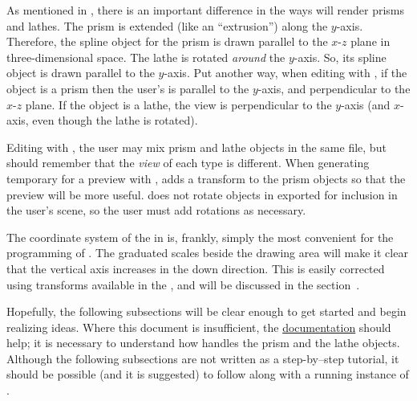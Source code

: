 	As mentioned in ,
	there is an important difference
	in the ways \IXpov{} will render prisms and lathes.
	The prism is extended (like an ``extrusion'') along the
	$y$-axis. Therefore, the spline object for the prism
	is drawn parallel to the $x$-$z$ plane in three-dimensional space.
	The lathe is rotated \emph{around} the $y$-axis. So, its
	spline object is drawn parallel to the $y$-axis. Put another way,
	when editing with \IXpkg{}, if the object is a prism
	then the user's  is parallel to the
	$y$-axis, and perpendicular to the $x$-$z$ plane. If the
	object is a lathe, the view is perpendicular to the $y$-axis
	(and $x$-axis, even though the lathe is rotated).
	
	Editing with \IXpkg{}, the user may mix prism and lathe
	objects in the same file, but should remember that the
	\emph{view} of each type is different. When generating
	temporary  for a preview with \IXpov{}, \IXpkg{}
	adds a  transform to the prism objects
	so that the preview will be more useful. \IXpkgu{} does
	not rotate objects in  exported for
	inclusion in the user's scene, so the user must add
	rotations as necessary.
	
	The coordinate system of the  in \IXpkg{}
	is, frankly, simply the most convenient for the programming
	of \IXpkg{}. The graduated scales beside the drawing area
	will make it clear that the vertical axis increases
	in the down direction. This is easily corrected using
	transforms available in the , and will be discussed
	in the section~.

	Hopefully, the following subsections will be clear enough
	to get started and begin realizing ideas. Where
	this document is insufficient, the \IXpov{}
	\href{\URLPOVdocs}{documentation} should help;
	it is necessary to understand how \IXpov{} handles the
	prism and the lathe objects.
	Although the following subsections are not written as a
	step-by--step tutorial, it should be possible
	(and it is suggested) to follow along with a running
	instance of \IXpkg{}.

